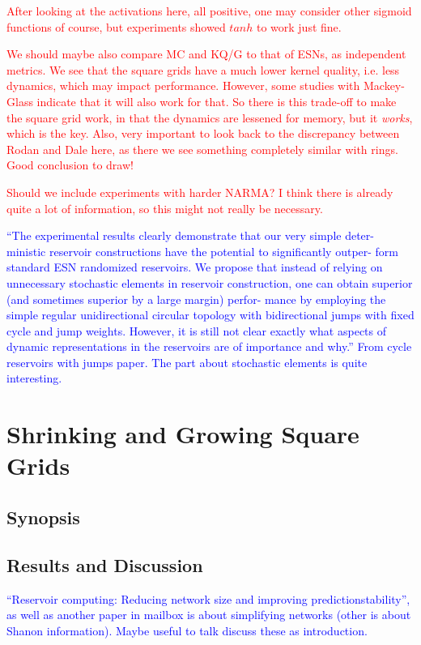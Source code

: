 \textcolor{red}{
  After looking at the activations here, all positive, one may consider other
sigmoid functions of course, but experiments showed $tanh$ to work just fine.
}

\textcolor{red}{
  We should maybe also compare MC and KQ/G to that of ESNs, as independent
metrics. We see that the square grids have a much lower kernel quality,
i.e. less dynamics, which may impact performance. However, some studies with
Mackey-Glass indicate that it will also work for that. So there is this
trade-off to make the square grid work, in that the dynamics are lessened for
memory, but it \textit{works}, which is the key. Also, very important to look
back to the discrepancy between Rodan and Dale here, as there we see something
completely similar with rings. Good conclusion to draw!
}

\textcolor{red}{
  Should we include experiments with harder NARMA? I think there is already
quite a lot of information, so this might not really be necessary.
}

\textcolor{blue}{
  ``The experimental results clearly demonstrate that our very simple deter-
ministic reservoir constructions have the potential to significantly outper-
form standard ESN randomized reservoirs. We propose that instead of relying on
unnecessary stochastic elements in reservoir construction, one can obtain
superior (and sometimes superior by a large margin) perfor- mance by employing
the simple regular unidirectional circular topology with bidirectional jumps
with fixed cycle and jump weights. However, it is still not clear exactly what
aspects of dynamic representations in the reservoirs are of importance and
why.'' From cycle reservoirs with jumps paper. The part about stochastic
elements is quite interesting.
}

\section{Shrinking and Growing Square Grids}

\subsection{Synopsis}

\subsection{Results and Discussion}

\textcolor{blue}{
  ``Reservoir computing: Reducing network size and improving
predictionstability'', as well as another paper in mailbox is about simplifying
networks (other is about Shanon information). Maybe useful to talk discuss these
as introduction.
}

